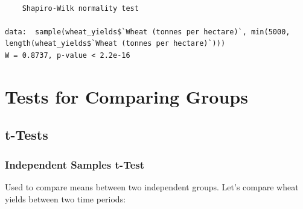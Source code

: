 \documentclass[
  letterpaper,
]{book}
\newenvironment{Shaded}{\begin{snugshade}}{\end{snugshade}}
\newcommand{\AttributeTok}[1]{\textcolor[rgb]{0.40,0.45,0.13}{#1}}
\newcommand{\CommentTok}[1]{\textcolor[rgb]{0.37,0.37,0.37}{#1}}
\newcommand{\DecValTok}[1]{\textcolor[rgb]{0.68,0.00,0.00}{#1}}
\newcommand{\FunctionTok}[1]{\textcolor[rgb]{0.28,0.35,0.67}{#1}}
\newcommand{\NormalTok}[1]{\textcolor[rgb]{0.00,0.23,0.31}{#1}}
\newcommand{\SpecialCharTok}[1]{\textcolor[rgb]{0.37,0.37,0.37}{#1}}
\newcommand{\StringTok}[1]{\textcolor[rgb]{0.13,0.47,0.30}{#1}}
\begin{document}
\begin{Shaded}
\end{Shaded}

\begin{verbatim}

    Shapiro-Wilk normality test

data:  sample(wheat_yields$`Wheat (tonnes per hectare)`, min(5000, length(wheat_yields$`Wheat (tonnes per hectare)`)))
W = 0.8737, p-value < 2.2e-16
\end{verbatim}

\section{Tests for Comparing Groups}\label{tests-for-comparing-groups}

\subsection{t-Tests}\label{t-tests}

\subsubsection{Independent Samples
t-Test}\label{independent-samples-t-test-1}

Used to compare means between two independent groups. Let's compare
wheat yields between two time periods:
\end{document}
